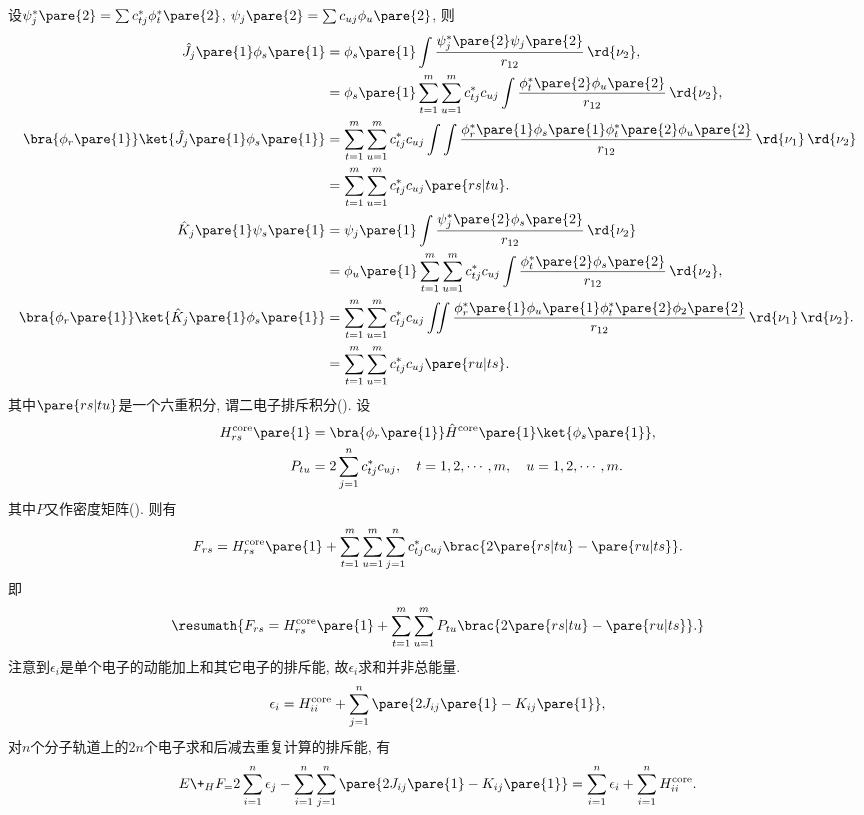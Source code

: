 \documentclass[hidelinks]{ctexart}
\begin{document}
设$\psi_j^*\pare{2} = \sum c^*_{tj}\phi^*_t\pare{2}$, $\psi_j\pare{2} = \sum c_{uj}\phi_u\pare{2}$, 则
\begin{align*}
    \hat J_j\pare{1}\phi_s\pare{1} &= \phi_s\pare{1}\int \frac{\psi^*_j\pare{2} \psi_j\pare{2}}{r_{12}}\,\rd{\nu_2}, \\
    &= \phi_s\pare{1} \sum_{t=1}^m \sum_{u=1}^m c^*_{tj}c_{uj} \int \frac{\phi^*_t\pare{2}\phi_u\pare{2}}{r_{12}}\,\rd{\nu_2}, \\
    \bra{\phi_r\pare{1}}\ket{\hat J_j\pare{1}\phi_s\pare{1}} &= \sum_{t=1}^m \sum_{u=1}^m c^*_{tj}c_{uj} \int\int \frac{\phi^*_r\pare{1}\phi_s\pare{1}\phi^*_t\pare{2}\phi_u\pare{2}}{r_{12}}\,\rd{\nu_1}\,\rd{\nu_2}\\
    &= \sum_{t=1}^m \sum_{u=1}^m c^*_{tj}c_{uj}\pare{rs\vert tu}. \\
    \hat K_j\pare{1}\psi_s\pare{1} &= \psi_j\pare{1} \int \frac{\psi^*_j\pare{2}\phi_s\pare{2}}{r_{12}}\,\rd{\nu_2} \\
    &= \phi_u\pare{1}\sum_{t=1}^m \sum_{u=1}^m c^*_{tj}c_{uj} \int \frac{\phi_t^*\pare{2}\phi_s\pare{2}}{r_{12}}\,\rd{\nu_2}, \\
    \bra{\phi_r\pare{1}}\ket{\hat K_j\pare{1}\phi_s\pare{1}} &= \sum_{t=1}^m \sum_{u=1}^m c^*_{tj}c_{uj} \iint \frac{\phi^*_r\pare{1}\phi_u\pare{1}\phi_t^*\pare{2}\phi_2\pare{2}}{r_{12}}\,\rd{\nu_1}\,\rd{\nu_2}. \\
    &= \sum_{t=1}^m \sum_{u=1}^m c^*_{tj}c_{uj} \pare{ru\vert ts}.
\end{align*}
其中$\pare{rs\vert tu}$是一个六重积分, 谓二电子排斥积分(). 设
\begin{align*}
    H_{rs}^{\mathrm{core}}\pare{1} &= \bra{\phi_r\pare{1}}\hat H^{\mathrm{core}}\pare{1}\ket{\phi_s\pare{1}}, \\
    P_{tu} &= 2\sum_{j=1}^n c^*_{tj}c_{uj},\quad t= 1,2,\cdots,m,\quad u = 1,2,\cdots,m.
\end{align*}
其中$P$又作密度矩阵(). 则有
\[ {F_{rs} = H_{rs}^{\mathrm{core}}\pare{1} + \sum_{t=1}^m \sum_{u=1}^m \sum_{j=1}^n c_{tj}^* c_{uj}\brac{2\pare{rs\vert tu} - \pare{ru\vert ts}}. } \]
即
\[ \resumath{F_{rs} = H_{rs}^{\mathrm{core}}\pare{1} + \sum_{t=1}^m \sum_{u=1}^m P_{tu}\brac{2\pare{rs\vert tu} - \pare{ru\vert ts}}. } \]
注意到$\epsilon_i$是单个电子的动能加上和其它电子的排斥能, 故$\epsilon_i$求和并非总能量.
\[ \epsilon_i = H_{ii}^{\mathrm{core}} + \sum_{j=1}^n \pare{2J_{ij}\pare{1} - K_{ij}\pare{1}}, \]
对$n$个分子轨道上的$2n$个电子求和后减去重复计算的排斥能, 有
\[ E\+_HF_ = 2\sum_{i=1}^n \epsilon_j - \sum_{i=1}^n \sum_{j=1}^n \pare{2J_{ij}\pare{1} - K_{ij}\pare{1}} = \sum_{i=1}^n \epsilon_i + \sum_{i=1}^n H^{\mathrm{core}}_{ii}. \]
\end{document}
